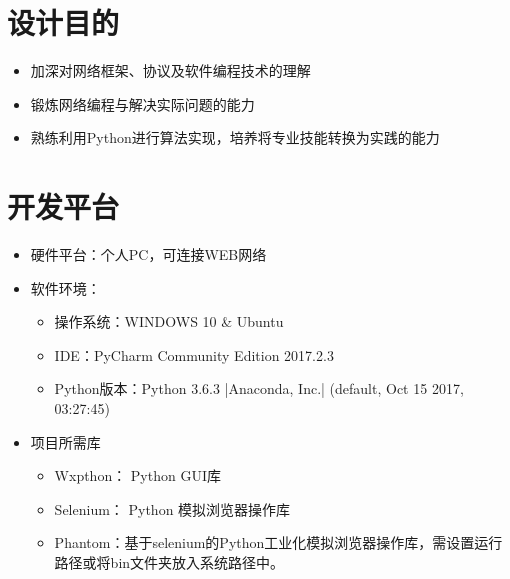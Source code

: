 \documentclass[UTF-8,a4paper, 12pt]{article}
\numberwithin{equation}{section}
\begin{document}
\tableofcontents
\newpage

\section{设计目的}
\vspace {0.2cm}
\begin{itemize}
  \item 加深对网络框架、协议及软件编程技术的理解
  \item 锻炼网络编程与解决实际问题的能力
  \item 熟练利用Python进行算法实现，培养将专业技能转换为实践的能力
\end{itemize}

\section{开发平台}
\begin{itemize}
  \item 硬件平台：个人PC，可连接WEB网络
  \item 软件环境：
  \begin{itemize}
    \item 操作系统：WINDOWS 10 \& Ubuntu
    \item IDE：PyCharm Community Edition 2017.2.3
    \item Python版本：Python 3.6.3 |Anaconda, Inc.| (default, Oct 15 2017, 03:27:45)
  \end{itemize}
  \item 项目所需库
  \begin{itemize}
    \item Wxpthon： Python GUI库
    \item Selenium： Python 模拟浏览器操作库
    \item Phantom：基于selenium的Python工业化模拟浏览器操作库，需设置运行路径或将bin文件夹放入系统路径中。
  \end{itemize}
\end{itemize}
\end{document}
